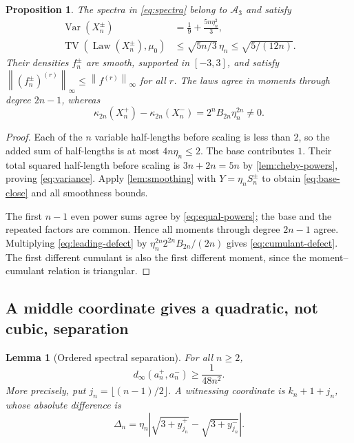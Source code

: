 \documentclass[11pt,a4paper]{article}
\newtheorem{proposition}[theorem]{Proposition}
\newtheorem{lemma}[theorem]{Lemma}
\theoremstyle{definition}
\theoremstyle{remark}
\DeclareMathOperator{\TV}{TV}
\DeclareMathOperator{\Law}{Law}
\DeclareMathOperator{\Var}{Var}
\newcommand{\A}{\mathcal A}
\newcommand{\norm}[1]{\left\lVert #1\right\rVert}
\begin{document}
\begin{proposition}\label{prop:pairs}
The spectra in \eqref{eq:spectra} belong to $\A_3$ and satisfy
\begin{align}
 \Var(X_n^\pm)&=\frac19+\frac{5n\eta_n^2}{3},             \label{eq:variance}\\
 \TV(\Law(X_n^\pm),\mu_0)&\le\sqrt{5n/3}\,\eta_n
                                    \le\sqrt{5/(12n)}. \label{eq:base-close}
\end{align}
Their densities $f_n^\pm$ are smooth, supported in $[-3,3]$, and satisfy
$\norm{(f_n^\pm)^{(r)}}_\infty\le\norm{f^{(r)}}_\infty$ for all $r$.
The laws agree in moments through degree $2n-1$, whereas
\begin{equation}\label{eq:cumulant-defect}
 \kappa_{2n}(X_n^+)-\kappa_{2n}(X_n^-)
         =2^n B_{2n}\eta_n^{2n}\ne0.
\end{equation}
\end{proposition}

\begin{proof}
Each of the $n$ variable half-lengths before scaling is less than $2$,
so the added sum of half-lengths is at most $4n\eta_n\le2$. The base
contributes $1$. Their total squared half-length before scaling is
$3n+2n=5n$ by \cref{lem:cheby-powers}, proving \eqref{eq:variance}.
Apply \cref{lem:smoothing} with $Y=\eta_nS_n^\pm$ to obtain
\eqref{eq:base-close} and all smoothness bounds.

The first $n-1$ even power sums agree by \eqref{eq:equal-powers}; the base
and the repeated factors are common. Hence all moments through degree
$2n-1$ agree. Multiplying \eqref{eq:leading-defect} by
$\eta_n^{2n}2^{2n}B_{2n}/(2n)$ gives \eqref{eq:cumulant-defect}.
The first different cumulant is also the first different moment, since
the moment--cumulant relation is triangular.
\end{proof}

\subsection{A middle coordinate gives a quadratic, not cubic, separation}

\begin{lemma}[Ordered spectral separation]\label{lem:gap}
For all $n\ge2$,
\begin{equation}\label{eq:gap}
 d_\infty(a_n^+,a_n^-)\ge\frac1{48n^2}.
\end{equation}
More precisely, put $j_n=\lfloor(n-1)/2\rfloor$. A witnessing coordinate
is $k_n+1+j_n$, whose absolute difference is
\begin{equation}\label{eq:actual-gap}
 \Delta_n=\eta_n\left|
    \sqrt{3+y_{j_n}^+}-\sqrt{3+y_{j_n}^-}\right|.
\end{equation}
\end{lemma}
\end{document}
